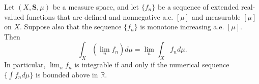 Let $(X, \mathbf{S}, \mu)$ be a measure space, and let $\{f_n\}$ be a sequence of extended real-valued functions that are defined and nonnegative a.e. $[\mu]$ and measurable $[\mu]$ on $X$. Suppose also that the sequence $\{f_n\}$ is monotone increasing a.e. $[\mu]$. Then
$$\int_X (\lim_n f_n) d\mu = \lim_n \int_X f_n d\mu.$$
In particular, $\lim_n f_n$ is integrable if and only if the numerical sequence $\{\int f_n d\mu\}$ is bounded above in $\mathbb{R}$.
